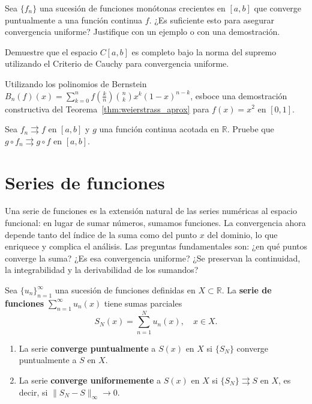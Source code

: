 \begin{prob} Sea $\{f_n\}$ una sucesión de funciones monótonas crecientes
          en $[a,b]$ que converge puntualmente a una función continua
          $f$. ¿Es suficiente esto para asegurar convergencia
          uniforme? Justifique con un ejemplo o con una demostración.
\end{prob}

\begin{prob}Demuestre que el espacio $C[a,b]$ es completo bajo la norma
          del supremo utilizando el Criterio de Cauchy para
          convergencia uniforme.
\end{prob}

\begin{prob} Utilizando los polinomios de Bernstein
          $B_n(f)(x) = \sum_{k=0}^n f\!\left(\frac{k}{n}\right)
          \binom{n}{k} x^k (1-x)^{n-k}$,
          esboce una demostración constructiva del
          Teorema~\ref{thm:weierstrass_aprox} para $f(x)=x^2$ en
          $[0,1]$.
\end{prob}

\begin{prob} Sea $f_n \rightrightarrows f$ en $[a,b]$ y $g$ una función
          continua acotada en $\mathbb{R}$. Pruebe que
          $g \circ f_n \rightrightarrows g \circ f$ en $[a,b]$.

\end{prob}

\section{Series de funciones}

Una serie de funciones es la extensión natural de las series numéricas
al espacio funcional: en lugar de sumar números, sumamos funciones. La
convergencia ahora depende tanto del índice de la suma como del punto
$x$ del dominio, lo que enriquece y complica el análisis. Las preguntas
fundamentales son: ¿en qué puntos converge la suma? ¿Es esa
convergencia uniforme? ¿Se preservan la continuidad, la integrabilidad
y la derivabilidad de los sumandos?

\begin{definition}
Sea $\{u_n\}_{n=1}^\infty$ una sucesión de funciones definidas en
$X \subset \mathbb{R}$. La \textbf{serie de funciones}
$\sum_{n=1}^\infty u_n(x)$ tiene sumas parciales
\[
    S_N(x) = \sum_{n=1}^N u_n(x), \quad x \in X.
\]
\begin{enumerate}
    \item La serie \textbf{converge puntualmente} a $S(x)$ en $X$ si
          $\{S_N\}$ converge puntualmente a $S$ en $X$.
    \item La serie \textbf{converge uniformemente} a $S(x)$ en $X$
          si $\{S_N\} \rightrightarrows S$ en $X$, es decir,
          si $\|S_N - S\|_\infty \to 0$.
\end{enumerate}
\end{definition}

